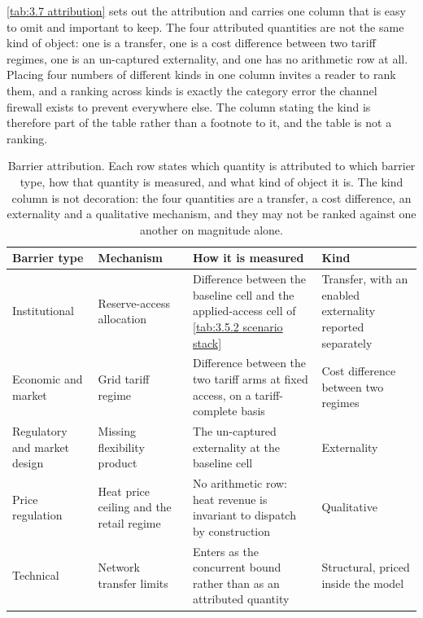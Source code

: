 \autoref{tab:3.7 attribution} sets out the attribution and carries one column that is easy to omit and important to keep. The four attributed quantities are not the same kind of object: one is a transfer, one is a cost difference between two tariff regimes, one is an un-captured externality, and one has no arithmetic row at all. Placing four numbers of different kinds in one column invites a reader to rank them, and a ranking across kinds is exactly the category error the channel firewall exists to prevent everywhere else. The column stating the kind is therefore part of the table rather than a footnote to it, and the table is not a ranking.

\begin{table}[h]
\centering
\caption{Barrier attribution. Each row states which quantity is attributed to which barrier type, how that quantity is measured, and what kind of object it is. The kind column is not decoration: the four quantities are a transfer, a cost difference, an externality and a qualitative mechanism, and they may not be ranked against one another on magnitude alone.}
\small
\begin{tabular}{p{3.4cm} p{2.3cm} p{4.4cm} p{4.2cm}}
\toprule
\textbf{Barrier type} & \textbf{Mechanism} & \textbf{How it is measured} & \textbf{Kind} \\
\midrule
Institutional & Reserve-access allocation & Difference between the baseline cell and the applied-access cell of \autoref{tab:3.5.2 scenario stack} & Transfer, with an enabled externality reported separately \\
Economic and market & Grid tariff regime & Difference between the two tariff arms at fixed access, on a tariff-complete basis & Cost difference between two regimes \\
Regulatory and market design & Missing flexibility product & The un-captured externality at the baseline cell & Externality \\
Price regulation & Heat price ceiling and the retail regime & No arithmetic row: heat revenue is invariant to dispatch by construction & Qualitative \\
Technical & Network transfer limits & Enters as the concurrent bound rather than as an attributed quantity & Structural, priced inside the model \\
\bottomrule
\end{tabular}
\label{tab:3.7 attribution}
\end{table}

